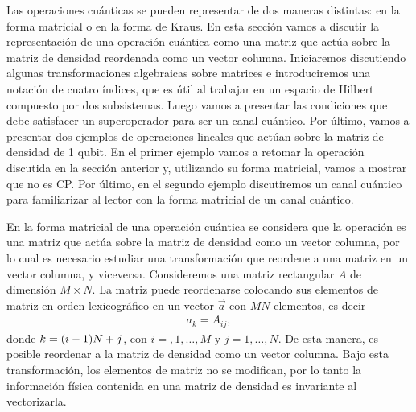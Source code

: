 Las operaciones cuánticas se pueden representar de dos 
maneras distintas: en la forma matricial 
o en la forma de Kraus.
En esta sección vamos a discutir la representación de una operación cuántica como 
una matriz que actúa sobre la matriz de densidad reordenada
como un vector columna.
Iniciaremos discutiendo algunas
transformaciones algebraicas sobre matrices e introduciremos 
una notación de cuatro índices, que es útil al trabajar en un espacio de Hilbert 
compuesto por dos subsistemas. Luego vamos a presentar 
las condiciones que debe satisfacer un superoperador para ser un 
canal cuántico. Por último, vamos a presentar dos ejemplos de operaciones
lineales que actúan sobre la matriz de densidad de 1 qubit. En el primer 
ejemplo vamos a retomar la operación discutida en la sección anterior y, 
utilizando su forma matricial, vamos a mostrar que no es CP. 
Por último, en el segundo ejemplo discutiremos un canal cuántico
para familiarizar al lector con la forma matricial de un canal cuántico.

En la forma matricial de una operación cuántica se 
considera que la operación es una matriz que actúa sobre la matriz de densidad 
como un vector columna, por lo cual es necesario estudiar una 
transformación que reordene a una matriz en un vector columna, y viceversa.
Consideremos una matriz rectangular $A$ de dimensión $M\times N$.
La matriz puede reordenarse colocando sus elementos de matriz en 
orden lexicográfico en un vector $\vec{a}$ con $MN$ elementos, es decir
\begin{align}
a_k=A_{ij}, 
\label{eq:matrix-to-vector}
\end{align}
donde $k=\qty(i-1)N+j$, con $i=,1,\ldots,M$ y $j=1,\ldots,N$. De
esta manera, es posible reordenar a la matriz de densidad como un 
vector columna. Bajo esta transformación, los elementos de matriz no se 
modifican, por lo tanto la información física contenida en una matriz 
de densidad es invariante al vectorizarla.

